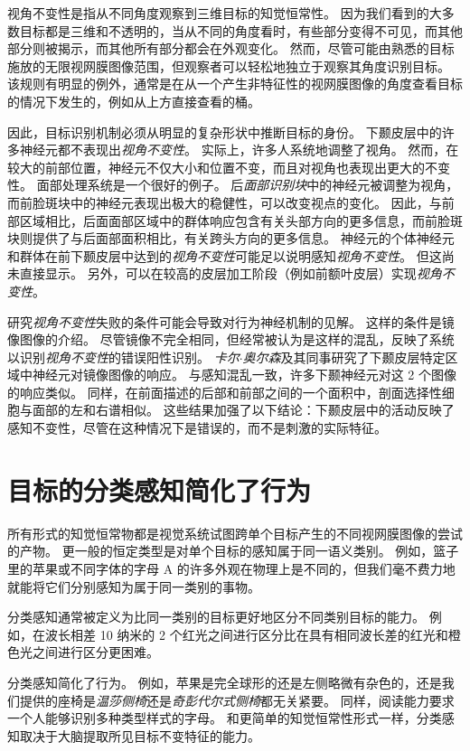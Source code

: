 视角不变性是指从不同角度观察到三维目标的知觉恒常性。
因为我们看到的大多数目标都是三维和不透明的，当从不同的角度看时，有些部分变得不可见，而其他部分则被揭示，而其他所有部分都会在外观变化。
然而，尽管可能由熟悉的目标施放的无限视网膜图像范围，但观察者可以轻松地独立于观察其角度识别目标。
该规则有明显的例外，通常是在从一个产生非特征性的视网膜图像的角度查看目标的情况下发生的，例如从上方直接查看的桶。


因此，目标识别机制必须从明显的复杂形状中推断目标的身份。
下颞皮层中的许多神经元都不表现出\textit{视角不变性}。
实际上，许多人系统地调整了视角。
然而，在较大的前部位置，神经元不仅大小和位置不变，而且对视角也表现出更大的不变性。
面部处理系统是一个很好的例子。
后\textit{面部识别块}中的神经元被调整为视角，而前脸斑块中的神经元表现出极大的稳健性，可以改变视点的变化。
因此，与前部区域相比，后面面部区域中的群体响应包含有关头部方向的更多信息，而前脸斑块则提供了与后面部面积相比，有关跨头方向的更多信息。
神经元的个体神经元和群体在前下颞皮层中达到的\textit{视角不变性}可能足以说明感知\textit{视角不变性}。
但这尚未直接显示。
另外，可以在较高的皮层加工阶段（例如前额叶皮层）实现\textit{视角不变性}。


研究\textit{视角不变性}失败的条件可能会导致对行为神经机制的见解。
这样的条件是镜像图像的介绍。
尽管镜像不完全相同，但经常被认为是这样的混乱，反映了系统以识别\textit{视角不变性}的错误阳性识别。
\textit{卡尔$\cdot$奥尔森}及其同事研究了下颞皮层特定区域中神经元对镜像图像的响应\cite{rollenhagen2000mirror}。
与感知混乱一致，许多下颞神经元对这 2 个图像的响应类似。
同样，在前面描述的后部和前部之间的一个面积中，剖面选择性细胞与面部的左和右谱相似。
这些结果加强了以下结论：下颞皮层中的活动反映了感知不变性，尽管在这种情况下是错误的，而不是刺激的实际特征。



\section{目标的分类感知简化了行为}

所有形式的知觉恒常物都是视觉系统试图跨单个目标产生的不同视网膜图像的尝试的产物。
更一般的恒定类型是对单个目标的感知属于同一语义类别。
例如，篮子里的苹果或不同字体的字母 A 的许多外观在物理上是不同的，但我们毫不费力地就能将它们分别感知为属于同一类别的事物。


分类感知通常被定义为比同一类别的目标更好地区分不同类别目标的能力。
例如，在波长相差 10 纳米的 2 个红光之间进行区分比在具有相同波长差的红光和橙色光之间进行区分更困难。


分类感知简化了行为。
例如，苹果是完全球形的还是左侧略微有杂色的，还是我们提供的座椅是\textit{温莎侧椅}还是\textit{奇彭代尔式侧椅}都无关紧要。
同样，阅读能力要求一个人能够识别多种类型样式的字母。
和更简单的知觉恒常性形式一样，分类感知取决于大脑提取所见目标不变特征的能力。


